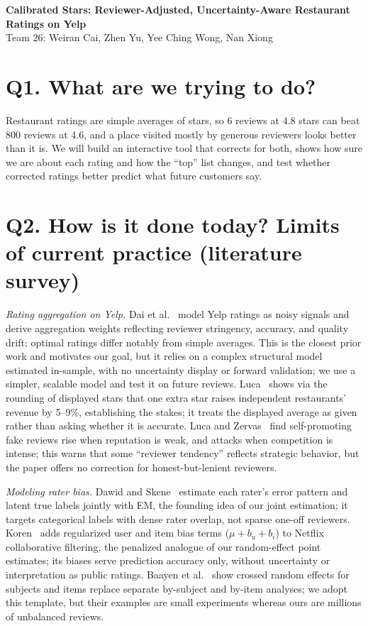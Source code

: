 \documentclass[11pt,letterpaper]{article}
\begin{document}
\begin{center}
{\large\bfseries Calibrated Stars: Reviewer-Adjusted, Uncertainty-Aware Restaurant Ratings on Yelp}\\[2pt]
Team 26: Weiran Cai, Zhen Yu, Yee Ching Wong, Nan Xiong
\end{center}
\vspace{-6pt}

\section{Q1. What are we trying to do?}
Restaurant ratings are simple averages of stars, so 6 reviews at 4.8 stars can beat 800 reviews at 4.6, and a place visited mostly by generous reviewers looks better than it is. We will build an interactive tool that corrects for both, shows how sure we are about each rating and how the ``top'' list changes, and test whether corrected ratings better predict what future customers say.

\section{Q2. How is it done today? Limits of current practice (literature survey)}
\textit{Rating aggregation on Yelp.} Dai et al.~\cite{dai2018} model Yelp ratings as noisy signals and derive aggregation weights reflecting reviewer stringency, accuracy, and quality drift; optimal ratings differ notably from simple averages. This is the closest prior work and motivates our goal, but it relies on a complex structural model estimated in-sample, with no uncertainty display or forward validation; we use a simpler, scalable model and test it on future reviews. Luca~\cite{luca2016} shows via the rounding of displayed stars that one extra star raises independent restaurants' revenue by 5--9\%, establishing the stakes; it treats the displayed average as given rather than asking whether it is accurate. Luca and Zervas~\cite{luca2016fake} find self-promoting fake reviews rise when reputation is weak, and attacks when competition is intense; this warns that some ``reviewer tendency'' reflects strategic behavior, but the paper offers no correction for honest-but-lenient reviewers.

\textit{Modeling rater bias.} Dawid and Skene~\cite{dawid1979} estimate each rater's error pattern and latent true labels jointly with EM, the founding idea of our joint estimation; it targets categorical labels with dense rater overlap, not sparse one-off reviewers. Koren~\cite{koren2008} adds regularized user and item bias terms ($\mu+b_u+b_i$) to Netflix collaborative filtering, the penalized analogue of our random-effect point estimates; its biases serve prediction accuracy only, without uncertainty or interpretation as public ratings. Baayen et al.~\cite{baayen2008} show crossed random effects for subjects and items replace separate by-subject and by-item analyses; we adopt this template, but their examples are small experiments whereas ours are millions of unbalanced reviews.
\end{document}
